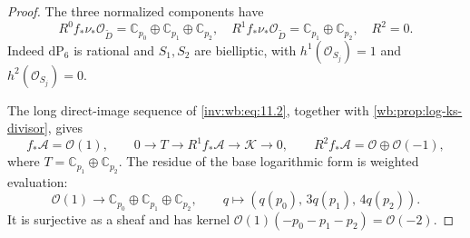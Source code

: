 \begin{proof}
The three normalized components have
\[
 R^0f_*\nu_*\mathcal O_{\widetilde D}
  =\mathbb C_{p_0}\oplus\mathbb C_{p_1}\oplus\mathbb C_{p_2},
 \quad
 R^1f_*\nu_*\mathcal O_{\widetilde D}
  =\mathbb C_{p_1}\oplus\mathbb C_{p_2},
 \quad R^2=0.
\tag{WBH.11.14}\label{inv:wb:eq:11.14}
\]
Indeed $\mathrm{dP}_6$ is rational and $S_1,S_2$ are bielliptic, with
$h^1(\mathcal O_{S_j})=1$ and $h^2(\mathcal O_{S_j})=0$.

The long direct-image sequence of \eqref{inv:wb:eq:11.2}, together with
\cref{wb:prop:log-ks-divisor}, gives
\[
 f_*\mathcal A=\mathcal O(1),\qquad
 0\longrightarrow T\longrightarrow R^1f_*\mathcal A
 \longrightarrow\mathcal K\longrightarrow0,
 \qquad R^2f_*\mathcal A=\mathcal O\oplus\mathcal O(-1),
\tag{WBH.11.15}\label{inv:wb:eq:11.15}
\]
where $T=\mathbb C_{p_1}\oplus\mathbb C_{p_2}$.
The residue of the base logarithmic form is weighted evaluation:
\[
 \mathcal O(1)\longrightarrow
 \mathbb C_{p_0}\oplus\mathbb C_{p_1}\oplus\mathbb C_{p_2},
 \qquad q\longmapsto(q(p_0),\,3q(p_1),\,4q(p_2)).
\tag{WBH.11.16}\label{inv:wb:eq:11.16}
\]
It is surjective as a sheaf and has kernel
$\mathcal O(1)(-p_0-p_1-p_2)=\mathcal O(-2)$.


\end{proof}
